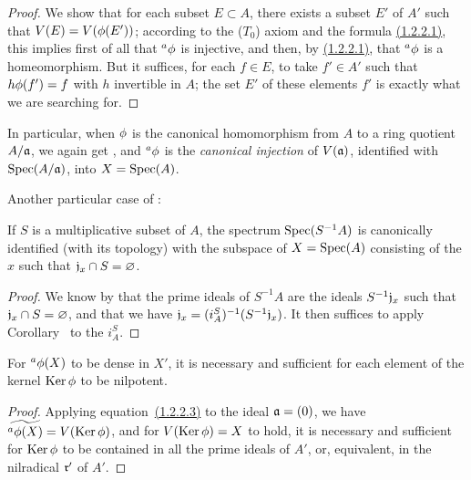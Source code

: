 \begin{proof}
\label{proof-1.1.2.4}
We show that for each subset $E\subset A$, there exists a subset $E'$ of $A'$ such that $V(E)=V(\phi(E'))$;
according to the ($T_0$) axiom  and the formula \hyperref[1.1.2.2]{(1.2.2.1)}, this implies first of all that ${}^a\phi$ is injective, and then, by \hyperref[1.1.2.2]{(1.2.2.1)}, that ${}^a\phi$ is a homeomorphism.
But it suffices, for each $f\in E$, to take $f'\in A'$ such that $h\phi(f')=f$ with $h$ invertible in $A$;
the set $E'$ of these elements $f'$ is exactly what we are searching for.
\end{proof}

\begin{env}[1.2.5]
\label{1.1.2.5}
In particular, when $\phi$ is the canonical homomorphism from $A$ to a ring quotient $A/\mathfrak{a}$, we again get , and ${}^a\phi$ is the \emph{canonical injection} of $V(\mathfrak{a})$, identified with ${\mathop{\mathrm{Spec}}\nolimits}(A/\mathfrak{a})$, into $X={\mathop{\mathrm{Spec}}\nolimits}(A)$.
\end{env}

Another particular case of :
\begin{cor}[1.2.6]
\label{1.1.2.6}
If $S$ is a multiplicative subset of $A$, the spectrum ${\mathop{\mathrm{Spec}}\nolimits}(S^{-1}A)$ is canonically identified (with its topology) with the subspace of $X={\mathop{\mathrm{Spec}}\nolimits}(A)$ consisting of the $x$ such that $\mathfrak{j}_x\cap S=\varnothing$.
\end{cor}

\begin{proof}
\label{proof-1.1.2.6}
We know by  that the prime ideals of $S^{-1}A$ are the ideals $S^{-1}\mathfrak{j}_x$ such that $\mathfrak{j}_x\cap S=\varnothing$, and that we have $\mathfrak{j}_x=(i_A^S)^{-1}(S^{-1}\mathfrak{j}_x)$.
It then suffices to apply Corollary~ to the $i_A^S$.
\end{proof}

\begin{cor}[1.2.7]
\label{1.1.2.7}
For ${}^a\phi(X)$ to be dense in $X'$, it is necessary and sufficient for each element of the kernel ${\mathop{\mathrm{Ker}}\nolimits}\,\phi$ to be nilpotent.
\end{cor}

\begin{proof}
\label{proof-1.1.2.7}
Applying equation~\hyperref[1.1.2.2]{(1.2.2.3)} to the ideal $\mathfrak{a}=(0)$, we have ${\widetilde{{}^a\phi(X)}}=V({\mathop{\mathrm{Ker}}\nolimits}\,\phi)$, and for $V({\mathop{\mathrm{Ker}}\nolimits}\,\phi)=X$ to hold, it is necessary and sufficient for ${\mathop{\mathrm{Ker}}\nolimits}\,\phi$ to be contained in all the prime ideals of $A'$, or, equivalent, in the nilradical $\mathfrak{r}'$ of $A'$.
\end{proof}

